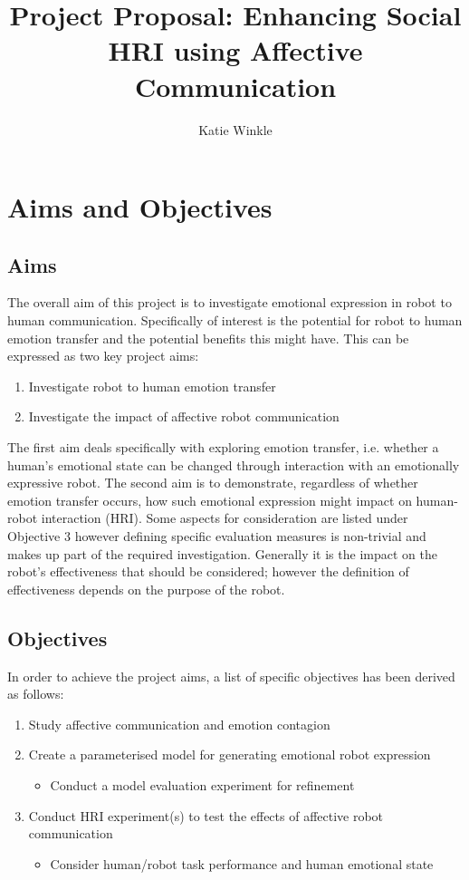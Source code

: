 \documentclass[11pt]{article}
\title{Project Proposal: Enhancing Social HRI using Affective Communication}
\author{Katie Winkle}
\begin{document}
\maketitle

\begin{abstract}

\end{abstract}

\section{Aims and Objectives}
\subsection{Aims}
The overall aim of this project is to investigate emotional expression in robot to human communication. Specifically of interest is the potential for robot to human emotion transfer and the potential benefits this might have. This can be expressed as two key project aims:

\begin{enumerate}
\item Investigate robot to human emotion transfer
\item Investigate the impact of affective robot communication
\end{enumerate}

The first aim deals specifically with exploring emotion transfer, i.e. whether a human's emotional state can be changed through interaction with an emotionally expressive robot. The second aim is to demonstrate, regardless of whether emotion transfer occurs, how such emotional expression might impact on human-robot interaction (HRI). Some aspects for consideration are listed under Objective 3 however defining specific evaluation measures is non-trivial and makes up part of the required investigation. Generally it is the impact on the robot's effectiveness that should be considered; however the definition of effectiveness depends on the purpose of the robot. 

\subsection{Objectives}
In order to achieve the project aims, a list of specific objectives has been derived as follows: 
\begin{enumerate}
\item Study affective communication and emotion contagion
\item Create a parameterised model for generating emotional robot expression
\begin{itemize}
\item Conduct a model evaluation experiment for refinement
\end{itemize}
\item Conduct HRI experiment(s) to test the effects of affective robot communication
\begin{itemize}
\item Consider human/robot task performance and human emotional state
\end{itemize}
\end{enumerate}
\end{document}
